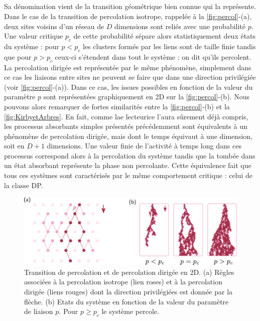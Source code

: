 \subparagraph{}Sa dénomination vient de la transition géométrique bien connue qui la représente. Dans le cas de la transition de percolation isotrope, rappelée à la \autoref{fig:percol}-(a), deux sites voisins d'un réseau de $D$ dimensions sont reliés avec une probabilité $p$. Une valeur critique $p_c$ de cette probabilité sépare alors statistiquement deux états du système : pour $p<p_c$ les clusters formés par les liens sont de taille finie tandis que pour $p>p_c$ ceux-ci s'étendent dans tout le système : on dit qu'ils percolent. La percolation dirigée est représentée par le même phénomène, simplement dans ce cas les liaisons entre sites ne peuvent se faire que dans une direction privilégiée (voir \autoref{fig:percol}-(a)). Dans ce cas, les issues possibles en fonction de la valeur du paramètre $p$ sont représentées graphiquement en 2D sur la \autoref{fig:percol}-(b). Nous pouvons alors remarquer de fortes similarités entre la \autoref{fig:percol}-(b) et la \autoref{fig:KirbyetArbres}. En fait, comme lae lecteurice l'aura sûrement déjà compris, les processus absorbants simples présentés précédemment sont équivalents à un phénomène de percolation dirigée, mais dont le temps équivaut à une dimension, soit en $D+1$ dimensions. Une valeur finie de l'activité à temps long dans ces processus correspond alors à la percolation du système tandis que la tombée dans un état absorbant représente la phase non percolante. Cette équivalence fait que tous ces systèmes sont caractérisés par le même comportement critique : celui de la classe DP.

\begin{figure}[h]
	\centering
	\includegraphics[width=\textwidth]{Chapitre1/Figures/CDP/Percol.pdf}
	\caption{Transition de percolation et de percolation dirigée en 2D. (a) Règles associées à la percolation isotrope (lien roses) et à la percolation dirigée (liens rouges) dont la direction privilégiées est donnée par la flèche. (b) Etats du système en fonction de la valeur du paramètre de liaison $p$. Pour $p\geq p_c$ le système percole.}
	\label{fig:percol}
\end{figure}

